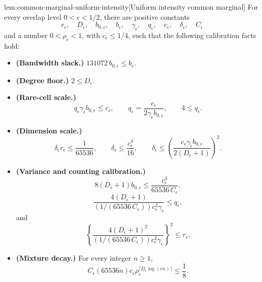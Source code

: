 \begin{lemmav}{lem:common-marginal-uniform-intensity}[Uniform intensity common marginal]
For every overlap level \(0<\epsilon<1/2\), there are positive constants
\[
r_\epsilon,\quad D_\epsilon,\quad b_{0,\epsilon},\quad b_\epsilon,\quad
\gamma_\epsilon,\quad q_\epsilon,\quad c_\epsilon,\quad \delta_\epsilon,\quad C_\epsilon
\]
and a number \(0<\rho_\epsilon<1\), with \(c_\epsilon\le 1/4\), such that the following calibration facts hold:
\begin{itemize}
\item \textbf{(Bandwidth slack.)} \(131072\,b_{0,\epsilon}\le b_\epsilon\).
\item \textbf{(Degree floor.)} \(2\le D_\epsilon\).
\item \textbf{(Rare-cell scale.)}
\[
q_\epsilon\gamma_\epsilon b_{0,\epsilon}\le c_\epsilon,
\qquad
q_\epsilon=
\frac{c_\epsilon}{2\gamma_\epsilon b_{0,\epsilon}},
\qquad
4\le q_\epsilon .
\]
\item \textbf{(Dimension scale.)}
\[
\delta_\epsilon r_\epsilon\le \frac1{65536},
\qquad
\delta_\epsilon\le \frac{c_\epsilon^4}{16},
\qquad
\delta_\epsilon\le
\left(\frac{c_\epsilon\gamma_\epsilon b_{0,\epsilon}}
{2(D_\epsilon+1)}\right)^2 .
\]
\item \textbf{(Variance and counting calibration.)}
\[
8(D_\epsilon+1)b_{0,\epsilon}
\le \frac{c_\epsilon^3}{65536\,C_\epsilon},
\]
\[
\frac{4(D_\epsilon+1)}
{(1/(65536\,C_\epsilon))c_\epsilon^2\gamma_\epsilon}
\le q_\epsilon,
\]
and
\[
\left\{
\frac{4(D_\epsilon+1)^2}
{(1/(65536\,C_\epsilon))c_\epsilon^2\gamma_\epsilon}
\right\}^2
\le r_\epsilon .
\]
\item \textbf{(Mixture decay.)} For every integer \(n\ge1\),
\[
C_\epsilon(65536n)c_\epsilon
\rho_\epsilon^{\lceil D_\epsilon\log(en)\rceil}
\le \frac18 .
\]
\end{itemize}


\end{lemmav}
